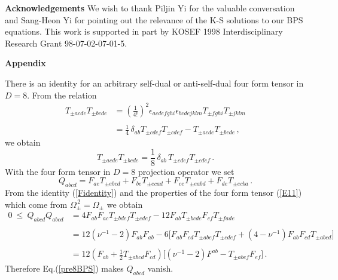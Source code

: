\documentclass[a4paper,11pt]{article}
\newcommand{\const}{{\nu}}
\def\const{{\nu}}
\begin{document}
{\large\bf Acknowledgements} We  wish to thank Piljin Yi for the valuable conversation and  Sang-Heon Yi for pointing out
the relevance of the K-S solutions to our BPS equations. This work is supported in part by KOSEF 1998 Interdisciplinary
Research Grant 98-07-02-07-01-5.






\newpage
\appendix
\begin{center}
\large{\textbf{Appendix}}
\end{center}
\setcounter{equation}{0}
\renewcommand{\theequation}{A.\arabic{equation}}
There is an identity for  an arbitrary self-dual or anti-self-dual four form tensor in $D=8$.  From the relation
\begin{equation}
\begin{array}{ll}
T_{\pm acde}T_{\pm bcde}&=\left(\displaystyle{\frac{1}{4!}}\right)^{2}\epsilon_{acdefghi}\epsilon_{bcdejklm}
T_{\pm fghi}T_{\pm jklm}\\ {}&{}\\
{}&=\displaystyle{\frac{1}{4}}\,\delta_{ab}T_{\pm cdef}T_{\pm cdef}-T_{\pm acde}T_{\pm bcde}\,,
\end{array}
\end{equation}
we obtain
\begin{equation}
T_{\pm acde}T_{\pm bcde}=\displaystyle{\frac{1}{8}}\,\delta_{ab}\,T_{\pm cdef}T_{\pm cdef}\,.
\label{Fidentity}
\end{equation}
With the four form tensor in $D=8$ projection operator  we set
\begin{equation}
Q_{abcd}=F_{ae}T_{\pm ebcd}+F_{be}T_{\pm ecad}+F_{ce}T_{\pm eabd}+F_{de}T_{\pm ecba}\,.
\end{equation}
{}From  the identity (\ref{Fidentity}) and the properties  of the four form tensor (\ref{E11}) which come from
$\Omega_{\pm}^{\,2}=\Omega_{\pm}$  we obtain
\begin{equation}
\begin{array}{ll}
0~\leq ~Q_{abcd}Q_{abcd}&=4F_{ab}F_{ac}T_{\pm bdef}T_{\pm
cdef}-12F_{ab}T_{\pm bcde}F_{cf}T_{\pm fade}\\ {}&{}\\
{}&=12(\const^{-1}-2)F_{ab}F_{ab}-6\bigg[F_{ab}F_{cd}T_{\pm
abef}T_{\pm cdef}+(4-\const^{-1}) F_{ab}F_{cd}T_{\pm abcd}\bigg]\\
{}&{}\\
{}&=12(F_{ab}+\textstyle{\frac{1}{2}}T_{\pm abcd}F_{cd})\bigg[(\const^{-1}-2)F^{ab}-T_{\pm abef}F_{ef}\bigg]\,.
\end{array}
\label{QQ}
\end{equation}
Therefore   Eq.(\ref{pre8BPS}) makes $Q_{abcd}$ vanish.\newline
\end{document}
